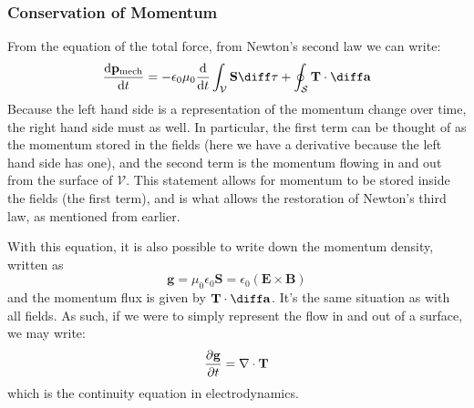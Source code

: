 \documentclass[10pt]{article}
\begin{document}
	\subsubsection{Conservation of Momentum}
	From the equation of the total force, from Newton's second law we can write:
	\begin{equation}\label{pmech}
		\dv{\mathbf{p}_\text{mech}}{t} = - \epsilon_0 \mu_0 \dv{t} \int_{\mathcal{V}} \mathbf{S} \diff \tau +
		\oint_{\mathcal{S}} \mathbf{T} \cdot \diff \mathbf{a}
	\end{equation}
	Because the left hand side is a representation of the momentum change over time, the right hand side must
	as well. In particular, the first term can be thought of as the momentum stored in the fields (here we
	have a derivative because the left hand side has one), and the second term is the momentum flowing in and
	out from the surface of \( \mathcal{V} \). This statement allows for momentum to be stored inside the
	fields (the first term), and is what allows the restoration of Newton's third law, as mentioned from
	earlier. 

	With this equation, it is also possible to write down the momentum density, written as
	\[
		\mathbf{g} = \mu_0 \epsilon_0 \mathbf{S} = \epsilon_0(\mathbf{E} \times \mathbf{B})
	\]
	and the momentum flux is given by \( \mathbf{T} \cdot \diff \mathbf{a} \). It's the same situation as
	with all fields. As such, if we were to simply represent the flow in and out of a surface, we may write:
	\[
		\pdv{\mathbf{g}}{t} = \nabla \cdot \mathbf{T}
	\]
	which is the continuity equation in electrodynamics. 
\end{document}

